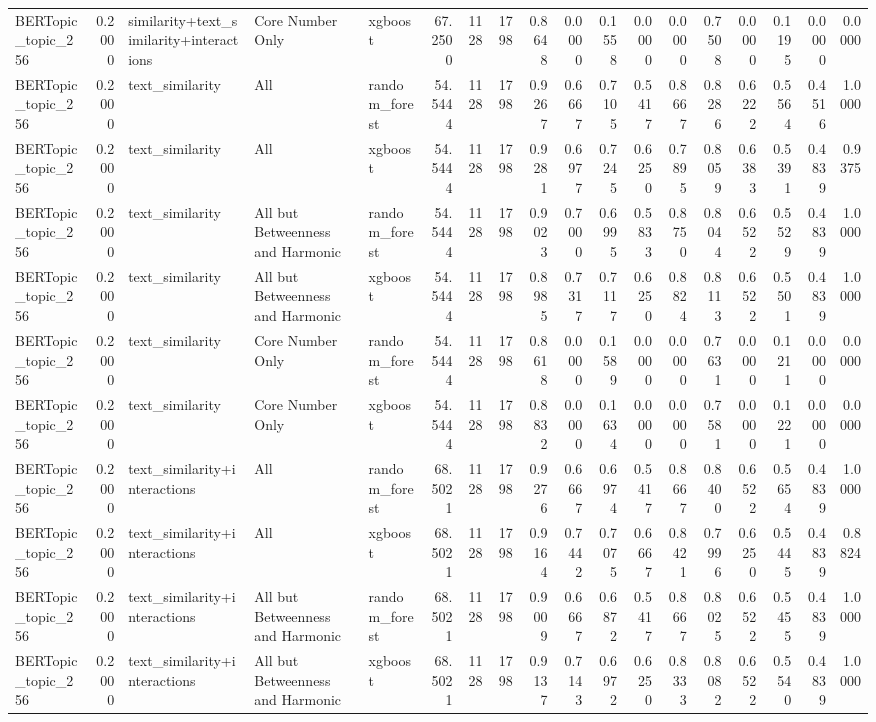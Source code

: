 \begin{tabular}{lrlllrrrrrrrrrrrrr}
BERTopic_topic_256 & 0.2000 & similarity+text_similarity+interactions & Core Number Only & xgboost & 67.2500 & 1128 & 1798 & 0.8648 & 0.0000 & 0.1558 & 0.0000 & 0.0000 & 0.7508 & 0.0000 & 0.1195 & 0.0000 & 0.0000 \\
BERTopic_topic_256 & 0.2000 & text_similarity & All & random_forest & 54.5444 & 1128 & 1798 & 0.9267 & 0.6667 & 0.7105 & 0.5417 & 0.8667 & 0.8286 & 0.6222 & 0.5564 & 0.4516 & 1.0000 \\
BERTopic_topic_256 & 0.2000 & text_similarity & All & xgboost & 54.5444 & 1128 & 1798 & 0.9281 & 0.6977 & 0.7245 & 0.6250 & 0.7895 & 0.8059 & 0.6383 & 0.5391 & 0.4839 & 0.9375 \\
BERTopic_topic_256 & 0.2000 & text_similarity & All but Betweenness and Harmonic & random_forest & 54.5444 & 1128 & 1798 & 0.9023 & 0.7000 & 0.6995 & 0.5833 & 0.8750 & 0.8044 & 0.6522 & 0.5529 & 0.4839 & 1.0000 \\
BERTopic_topic_256 & 0.2000 & text_similarity & All but Betweenness and Harmonic & xgboost & 54.5444 & 1128 & 1798 & 0.8985 & 0.7317 & 0.7117 & 0.6250 & 0.8824 & 0.8113 & 0.6522 & 0.5501 & 0.4839 & 1.0000 \\
BERTopic_topic_256 & 0.2000 & text_similarity & Core Number Only & random_forest & 54.5444 & 1128 & 1798 & 0.8618 & 0.0000 & 0.1589 & 0.0000 & 0.0000 & 0.7631 & 0.0000 & 0.1211 & 0.0000 & 0.0000 \\
BERTopic_topic_256 & 0.2000 & text_similarity & Core Number Only & xgboost & 54.5444 & 1128 & 1798 & 0.8832 & 0.0000 & 0.1634 & 0.0000 & 0.0000 & 0.7581 & 0.0000 & 0.1221 & 0.0000 & 0.0000 \\
BERTopic_topic_256 & 0.2000 & text_similarity+interactions & All & random_forest & 68.5021 & 1128 & 1798 & 0.9276 & 0.6667 & 0.6974 & 0.5417 & 0.8667 & 0.8400 & 0.6522 & 0.5654 & 0.4839 & 1.0000 \\
BERTopic_topic_256 & 0.2000 & text_similarity+interactions & All & xgboost & 68.5021 & 1128 & 1798 & 0.9164 & 0.7442 & 0.7075 & 0.6667 & 0.8421 & 0.7996 & 0.6250 & 0.5445 & 0.4839 & 0.8824 \\
BERTopic_topic_256 & 0.2000 & text_similarity+interactions & All but Betweenness and Harmonic & random_forest & 68.5021 & 1128 & 1798 & 0.9009 & 0.6667 & 0.6872 & 0.5417 & 0.8667 & 0.8025 & 0.6522 & 0.5455 & 0.4839 & 1.0000 \\
BERTopic_topic_256 & 0.2000 & text_similarity+interactions & All but Betweenness and Harmonic & xgboost & 68.5021 & 1128 & 1798 & 0.9137 & 0.7143 & 0.6972 & 0.6250 & 0.8333 & 0.8082 & 0.6522 & 0.5540 & 0.4839 & 1.0000 \\

\end{tabular}
